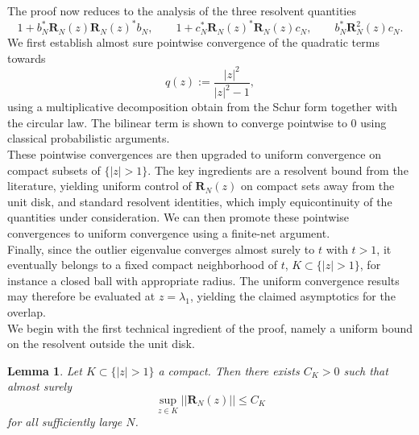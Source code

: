 \documentclass[12pt,a4paper]{amsart}
\theoremstyle{plain} %
\newtheorem{lemma}[theorem]{Lemma}
\newcommand{\la}{\lambda}
\begin{document}
The proof now reduces to the analysis of the three resolvent quantities
\begin{equation*}
    1+b_N^*\mathbf{R}_{N}(z)\mathbf{R}_{N}(z)^*b_N, \qquad
    1+c_N^*\mathbf{R}_{N}(z)^*\mathbf{R}_{N}(z)c_N, \qquad
    b_N^*\mathbf{R}_{N}^2(z)c_N.
\end{equation*}
We first establish almost sure pointwise convergence of the quadratic terms towards 
\begin{equation*}
    q(z):=\frac{\lvert z \lvert^2}{\lvert z \lvert^2-1},
\end{equation*}
using a multiplicative decomposition obtain from the Schur form together with the circular law. The bilinear term is shown to converge pointwise to $0$ using classical probabilistic arguments. \\
These pointwise convergences are then upgraded to uniform convergence on compact subsets of $\{\lvert z \lvert >1\}.$ The key ingredients are a resolvent bound from the literature, yielding uniform control of $\mathbf{R}_{N}(z)$ on compact sets away from the unit disk, and standard resolvent identities, which imply equicontinuity of the quantities under consideration. We can then promote these pointwise convergences to uniform convergence using a finite-net argument.\\
Finally, since the outlier eigenvalue converges almost surely to $t$ with $ t  >1$, it eventually belongs to a fixed compact neighborhood of $t$, $K \subset \{\lvert z \lvert >1\}$, for instance a closed ball with appropriate radius. The uniform convergence results may therefore be evaluated at $z=\la_1$, yielding the claimed asymptotics for the overlap.\\
We begin with the first technical ingredient of the proof, namely a uniform bound on the resolvent outside the unit disk. 
\begin{lemma}
    Let $K \subset \{\lvert z \lvert >1\}$ a compact. Then there exists $C_K>0$ such that almost surely \begin{equation*}
        \sup_{z\in K}\lvert \lvert \mathbf{R}_{N}(z) \lvert \lvert \leq C_K
    \end{equation*} 
    for all sufficiently large $N$.
\end{lemma}
\end{document}
